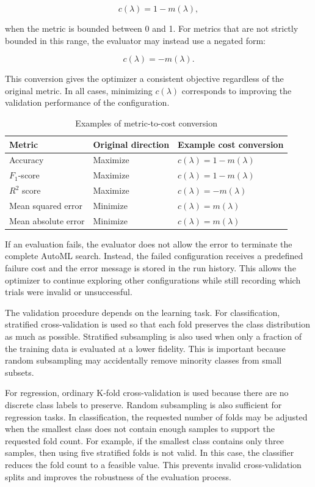 \documentclass[12pt,a4paper]{report}
\begin{document}
\[
c(\lambda) = 1 - m(\lambda),
\]

\noindent when the metric is bounded between 0 and 1. For metrics that are not strictly
bounded in this range, the evaluator may instead use a negated form:

\[
c(\lambda) = -m(\lambda).
\]

\noindent This conversion gives the optimizer a consistent objective regardless of the
original metric. In all cases, minimizing \(c(\lambda)\) corresponds to improving
the validation performance of the configuration.

\begin{table}[H]
\centering
\caption{Examples of metric-to-cost conversion}
\label{tab:gp-automl-metric-cost-conversion}
\begin{tabular}{p{}p{}p{}}
\toprule
Metric & Original direction & Example cost conversion \\
\midrule
Accuracy & Maximize & \(c(\lambda) = 1 - m(\lambda)\) \\
\(F_1\)-score & Maximize & \(c(\lambda) = 1 - m(\lambda)\) \\
\(R^2\) score & Maximize & \(c(\lambda) = -m(\lambda)\) \\
Mean squared error & Minimize & \(c(\lambda) = m(\lambda)\) \\
Mean absolute error & Minimize & \(c(\lambda) = m(\lambda)\) \\
\bottomrule
\end{tabular}
\end{table}

\noindent If an evaluation fails, the evaluator does not allow the error to terminate the
complete AutoML search. Instead, the failed configuration receives a predefined
failure cost and the error message is stored in the run history. This allows the
optimizer to continue exploring other configurations while still recording which
trials were invalid or unsuccessful.

\noindent The validation procedure depends on the learning task. For classification,
stratified cross-validation is used so that each fold preserves the class
distribution as much as possible. Stratified subsampling is also used when only a
fraction of the training data is evaluated at a lower fidelity. This is important
because random subsampling may accidentally remove minority classes from small
subsets.

\noindent For regression, ordinary K-fold cross-validation is used because there are no
discrete class labels to preserve. Random subsampling is also sufficient for
regression tasks. In classification, the requested number of folds may be
adjusted when the smallest class does not contain enough samples to support the
requested fold count. For example, if the smallest class contains only three
samples, then using five stratified folds is not valid. In this case, the
classifier reduces the fold count to a feasible value. This prevents invalid
cross-validation splits and improves the robustness of the evaluation process.
\end{document}
